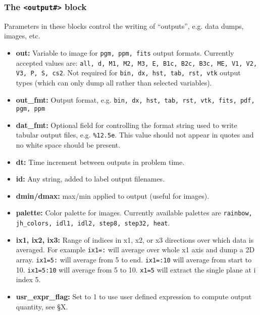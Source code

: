 \subsubsection{The {\tt <output\#>} block}

Parameters in these blocks control the writing of ``outputs'',
e.g. data dumps, images, etc.
\begin{itemize}

\item {\bf out:} Variable to image for {\tt pgm, ppm, fits} output formats.
Currently accepted values are:
{\tt all, d, M1, M2, M3, E, B1c, B2c, B3c, ME, V1, V2, V3, P, S, cs2}.
Not required for {\tt bin, dx, hst, tab, rst, vtk} output types 
(which can only dump all rather than selected variables).

\item {\bf out\_fmt:} Output format, e.g.  
{\tt bin, dx, hst, tab, rst, vtk, fits, pdf, pgm, ppm}

\item {\bf dat\_fmt:} Optional field for controlling the format string used 
to write tabular output files, e.g. {\tt \%12.5e}.  This value should
not appear in quotes and no white space should be present.

\item {\bf dt:} Time increment between outputs in problem time.

\item {\bf id:} Any string, added to label output filenames.

\item {\bf dmin/dmax:} max/min applied to output (useful for images).

\item {\bf palette:} Color palette for images.  Currently available palettes
are {\tt rainbow, jh\_colors, idl1, idl2, step8, step32, heat}.

\item {\bf ix1, ix2, ix3:} Range of indices in x1, x2, or x3 directions over
which data is averaged.  For example {\tt ix1=:} will average over whole x1 axis
and dump a 2D array.  {\tt ix1=5:} will average from 5 to end. {\tt ix1=:10}
will average from start to 10. {\tt ix1=5:10} will average from 5 to 10.
{\tt x1=5} will extract the single plane at i index 5.

\item {\bf usr\_expr\_flag:} Set to 1 to use user defined expression to compute
output quantity, see \S X.

\end{itemize}

